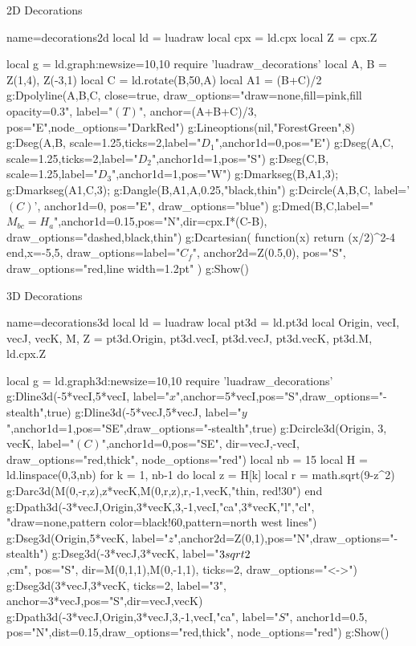 \begin{demo}{2D Decorations}
\begin{luadraw}{name=decorations2d}
local ld = luadraw
local cpx = ld.cpx
local Z = cpx.Z

local g = ld.graph:new{size={10,10}}
require 'luadraw_decorations'
local A, B = Z(1,4), Z(-3,1)
local C = ld.rotate(B,50,A)
local A1 = (B+C)/2
g:Dpolyline({A,B,C}, {close=true, draw_options="draw=none,fill=pink,fill opacity=0.3", 
    label="$(T)$", anchor=(A+B+C)/3, pos="E",node_options="DarkRed"})
g:Lineoptions(nil,"ForestGreen",8)
g:Dseg({A,B}, {scale=1.25,ticks=2,label="$D_1$",anchor1d=0,pos="E"})
g:Dseg({A,C}, {scale=1.25,ticks=2,label="$D_2$",anchor1d=1,pos="S"})
g:Dseg({C,B}, {scale=1.25,label="$D_3$",anchor1d=1,pos="W"})
g:Dmarkseg(B,A1,3); g:Dmarkseg(A1,C,3); g:Dangle(B,A1,A,0.25,"black,thin")
g:Dcircle({A,B,C}, {label='$(C)$', anchor1d=0, pos="E", draw_options="blue"})
g:Dmed(B,C,{label="$M_{bc}=H_a$",anchor1d=0.15,pos="N",dir=cpx.I*(C-B), draw_options="dashed,black,thin"})
g:Dcartesian( function(x) return (x/2)^2-4 end,{x={-5,5},
    draw_options={label="$C_f$", anchor2d=Z(0.5,0), pos="S", draw_options="red,line width=1.2pt"} })
g:Show()
\end{luadraw}
\end{demo}


\begin{demo}{3D Decorations}
\begin{luadraw}{name=decorations3d}
local ld = luadraw
local pt3d = ld.pt3d
local Origin, vecI, vecJ, vecK, M, Z = pt3d.Origin, pt3d.vecI, pt3d.vecJ, pt3d.vecK, pt3d.M, ld.cpx.Z

local g = ld.graph3d:new{size={10,10}}
require 'luadraw_decorations'
g:Dline3d(-5*vecI,5*vecI, {label="$x$",anchor=5*vecI,pos="S",draw_options="-stealth"},true)
g:Dline3d(-5*vecJ,5*vecJ, {label="$y$",anchor1d=1,pos="SE",draw_options="-stealth"},true)
g:Dcircle3d(Origin, 3, vecK, {label="$(C)$",anchor1d=0,pos="SE",
    dir={vecJ,-vecI}, draw_options="red,thick", node_options="red"})
local nb = 15
local H = ld.linspace(0,3,nb)
for k = 1, nb-1 do
    local z = H[k]
    local r = math.sqrt(9-z^2)
    g:Darc3d(M(0,-r,z),z*vecK,M(0,r,z),r,-1,vecK,"thin, red!30")
end
g:Dpath3d({-3*vecJ,Origin,3*vecK,3,-1,vecI,"ca",3*vecK,"l","cl"},
    "draw=none,pattern color=black!60,pattern=north west lines")
g:Dseg3d({Origin,5*vecK}, 
    {label="$z$",anchor2d=Z(0,1),pos="N",draw_options="-stealth"})   
g:Dseg3d({-3*vecJ,3*vecK}, {label="$3\\sqrt 2$\\,cm", pos="S", dir={M(0,1,1),M(0,-1,1)},
    ticks=2, draw_options="<->"}) 
g:Dseg3d({3*vecJ,3*vecK}, 
    {ticks=2, label="$3$", anchor=3*vecJ,pos="S",dir={vecJ,vecK}}) 
g:Dpath3d({-3*vecJ,Origin,3*vecJ,3,-1,vecI,"ca"}, 
    {label="$S$", anchor1d=0.5, pos="N",dist=0.15,draw_options="red,thick", node_options="red"})
g:Show()
\end{luadraw}
\end{demo}
